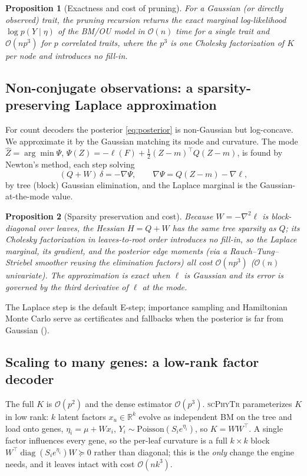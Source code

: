 \documentclass[11pt]{article}
\newtheorem{proposition}{Proposition}
\newcommand{\scphytr}{\textsc{scPhyTr}}
\newcommand{\RR}{\mathbb{R}}
\newcommand{\bigO}{\mathcal{O}}
\begin{document}
\begin{proposition}[Exactness and cost of pruning]
\label{prop:pruning}
For a Gaussian (or directly observed) trait, the pruning recursion returns the exact marginal
log-likelihood $\log p(Y\mid\eta)$ of the BM/OU model in $\bigO(n)$ time for a single trait
and $\bigO(np^3)$ for $p$ correlated traits, where the $p^3$ is one Cholesky factorization of
$K$ per node and introduces no fill-in.
\end{proposition}

\subsection{Non-conjugate observations: a sparsity-preserving Laplace approximation}
For count decoders the posterior \eqref{eq:posterior} is non-Gaussian but log-concave. We
approximate it by the Gaussian matching its mode and curvature. The mode $\hat Z=\arg\min\Psi$,
$\Psi(Z)=-\ell(F)+\tfrac12(Z-m)^\top Q(Z-m)$, is found by Newton's method, each step solving
\begin{equation}
(Q+W)\,\delta = -\nabla\Psi,\qquad \nabla\Psi=Q(Z-m)-\nabla\ell,
\end{equation}
by tree (block) Gaussian elimination, and the Laplace marginal is the Gaussian-at-the-mode
value.

\begin{proposition}[Sparsity preservation and cost]
\label{prop:laplace}
Because $W=-\nabla^2\ell$ is block-diagonal over leaves, the Hessian $H=Q+W$ has the same
tree sparsity as $Q$; its Cholesky factorization in leaves-to-root order introduces no
fill-in, so the Laplace marginal, its gradient, and the posterior edge moments (via a
Rauch--Tung--Striebel smoother reusing the elimination factors) all cost $\bigO(np^3)$
($\bigO(n)$ univariate). The approximation is exact when $\ell$ is Gaussian and its error is
governed by the third derivative of $\ell$ at the mode.
\end{proposition}

The Laplace step is the default E-step; importance sampling and Hamiltonian Monte Carlo serve
as certificates and fallbacks when the posterior is far from Gaussian ().

\subsection{Scaling to many genes: a low-rank factor decoder}
The full $K$ is $\bigO(p^2)$ and the dense estimator $\bigO(p^3)$. \scphytr{} parameterizes
$K$ in low rank: $k$ latent factors $x_u\in\RR^k$ evolve as independent BM on the tree and
load onto genes, $\eta_{i}=\mu+Wx_i$, $Y_i\sim\mathrm{Poisson}(S_i e^{\eta_i})$, so
$K=WW^\top$. A single factor influences every gene, so the per-leaf curvature is a full
$k\times k$ block $W^\top\!\operatorname{diag}(S_ie^{\eta_i})W\succeq 0$ rather than diagonal;
this is the \emph{only} change the engine needs, and it leaves  intact with
cost $\bigO(nk^3)$.
\end{document}
